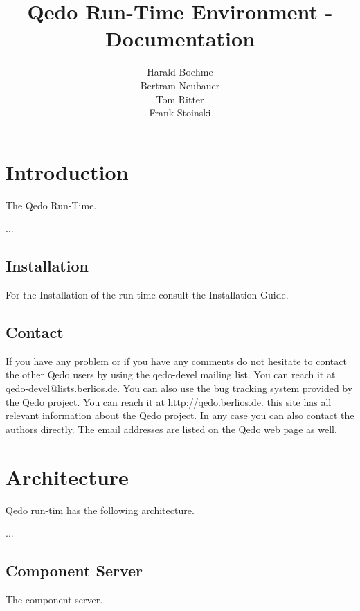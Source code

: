 \documentclass[12pt,a4paper]{report}
\begin{document}
\title{Qedo Run-Time Environment - Documentation}
\author{Harald Boehme \\ Bertram Neubauer \\ Tom Ritter \\ Frank Stoinski}

\maketitle

\setcounter{page}{1} 

\tableofcontents


\chapter{Introduction}
\label{sec:Introduction}

The Qedo Run-Time.

...
\section{Installation}
\label{sec:Installation}
For the Installation of the run-time consult the Installation Guide.


\section{Contact}
\label{sec:Contact}

If you have any problem or if you have any comments do not hesitate to contact the other Qedo users by using the qedo-devel mailing list. You can reach it at qedo-devel@lists.berlios.de. You can also use the bug tracking system provided by the Qedo project. You can reach it at http://qedo.berlios.de. this site has all relevant information about the Qedo project. In any case you can also contact the authors directly. The email addresses are listed on the Qedo web page as well.




\chapter{Architecture}
\label{sec:Architecture}
Qedo run-tim has the following architecture.

 ...

\section{Component Server}
\label{sec:AComponentServer}
The component server. 
\end{document}
